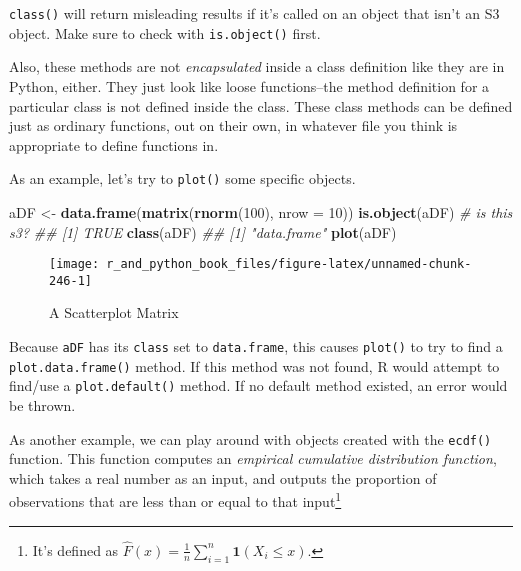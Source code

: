 \documentclass[12pt,krantz2]{krantz}
\makeatletter
\newenvironment{Shaded}{\begin{snugshade}}{\end{snugshade}}
\newcommand{\CommentTok}[1]{\textcolor[rgb]{0.37,0.37,0.37}{\textit{#1}}}
\newcommand{\DataTypeTok}[1]{\textcolor[rgb]{0.27,0.27,0.27}{#1}}
\newcommand{\DecValTok}[1]{\textcolor[rgb]{0.06,0.06,0.06}{#1}}
\newcommand{\KeywordTok}[1]{\textcolor[rgb]{0.27,0.27,0.27}{\textbf{#1}}}
\newcommand{\NormalTok}[1]{#1}
\newcommand{\StringTok}[1]{\textcolor[rgb]{0.5,0.5,0.5}{#1}}
\newenvironment{kframe}{%
\medskip{}
\setlength{\fboxsep}{.8em}
 \def\at@end@of@kframe{}%
 \ifinner\ifhmode%
  \def\at@end@of@kframe{\end{minipage}}%
  \begin{minipage}{\columnwidth}%
 \fi\fi%
 \def\FrameCommand##1{\hskip\@totalleftmargin \hskip-\fboxsep
 \colorbox{shadecolor}{##1}\hskip-\fboxsep
     \hskip-\linewidth \hskip-\@totalleftmargin \hskip\columnwidth}%
 \MakeFramed {\advance\hsize-\width
   \@totalleftmargin\z@ \linewidth\hsize
   \@setminipage}}%
 {\par\unskip\endMakeFramed%
 \at@end@of@kframe}
\renewenvironment{Shaded}{\begin{kframe}}{\end{kframe}}
\makeatother
\begin{document}
\begin{rmd-caution}
\texttt{class()} will return misleading results if it's called on an object that isn't an S3 object. Make sure to check with \texttt{is.object()} first.

\end{rmd-caution}

Also, these methods are not \emph{encapsulated} inside a class definition like they are in Python, either. They just look like loose functions--the method definition for a particular class is not defined inside the class. These class methods can be defined just as ordinary functions, out on their own, in whatever file you think is appropriate to define functions in.

As an example, let's try to \texttt{plot()} some specific objects.

\begin{Shaded}
\begin{Highlighting}[]
\NormalTok{aDF <-}\StringTok{ }\KeywordTok{data.frame}\NormalTok{(}\KeywordTok{matrix}\NormalTok{(}\KeywordTok{rnorm}\NormalTok{(}\DecValTok{100}\NormalTok{), }\DataTypeTok{nrow =} \DecValTok{10}\NormalTok{))}
\KeywordTok{is.object}\NormalTok{(aDF) }\CommentTok{# is this s3?}
\CommentTok{## [1] TRUE}
\KeywordTok{class}\NormalTok{(aDF)}
\CommentTok{## [1] "data.frame"}
\KeywordTok{plot}\NormalTok{(aDF)}
\end{Highlighting}
\end{Shaded}

\begin{figure}

{\centering \texttt{[image: r\_and\_python\_book\_files/figure-latex/unnamed-chunk-246-1]} 

}

\caption{A Scatterplot Matrix}\label{fig:unnamed-chunk-246}
\end{figure}

Because \texttt{aDF} has its \texttt{class} set to \texttt{data.frame}, this causes \texttt{plot()} to try to find a \texttt{plot.data.frame()} method. If this method was not found, R would attempt to find/use a \texttt{plot.default()} method. If no default method existed, an error would be thrown.

As another example, we can play around with objects created with the \texttt{ecdf()} function. This function computes an \emph{empirical cumulative distribution function}, which takes a real number as an input, and outputs the proportion of observations that are less than or equal to that input\footnote{It's defined as \(\hat{F}(x) = \frac{1}{n}\sum_{i=1}^n \mathbf{1}(X_i \le x)\).}
\end{document}
